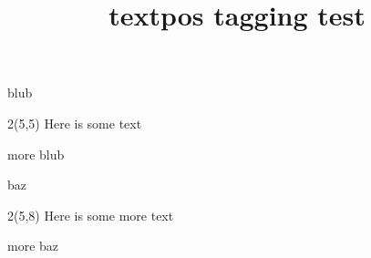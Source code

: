 \documentclass{article}
\title{textpos tagging test}
\begin{document}
blub
\begin{textblock}{2}(5,5)
Here is some text
\end{textblock}
more blub

baz

\begin{textblock}{2}(5,8)
Here is some more text
\end{textblock}

more baz
\end{document}
